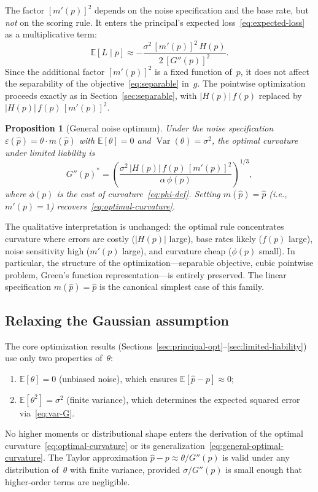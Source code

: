 \documentclass[11pt]{article}
\newtheorem{proposition}{Proposition}
\begin{document}
The factor $[m'(p)]^2$ depends on the noise specification and the base rate, but \emph{not} on the scoring rule. It enters the principal's expected loss~\eqref{eq:expected-loss} as a multiplicative term:
\[
\mathbb{E}[L \mid p] \approx -\frac{\sigma^2\,[m'(p)]^2\,H(p)}{2\,[G''(p)]^2}.
\]
Since the additional factor $[m'(p)]^2$ is a fixed function of~$p$, it does not affect the separability of the objective~\eqref{eq:separable} in~$g$. The pointwise optimization proceeds exactly as in Section~\ref{sec:separable}, with $|H(p)|\,f(p)$ replaced by $|H(p)|\,f(p)\,[m'(p)]^2$.

\begin{proposition}[General noise optimum]\label{prop:general-noise}
Under the noise specification $\varepsilon(\hat{p}) = \theta \cdot m(\hat{p})$ with $\mathbb{E}[\theta] = 0$ and $\operatorname{Var}(\theta) = \sigma^2$, the optimal curvature under limited liability is
\begin{equation}\label{eq:general-optimal-curvature}
G''(p)^* = \left(\frac{\sigma^2\,|H(p)|\,f(p)\,[m'(p)]^2}{\alpha\,\phi(p)}\right)^{\!1/3},
\end{equation}
where $\phi(p)$ is the cost of curvature~\eqref{eq:phi-def}. Setting $m(\hat{p}) = \hat{p}$ (i.e., $m'(p) = 1$) recovers~\eqref{eq:optimal-curvature}.
\end{proposition}

The qualitative interpretation is unchanged: the optimal rule concentrates curvature where errors are costly ($|H(p)|$ large), base rates likely ($f(p)$ large), noise sensitivity high ($m'(p)$ large), and curvature cheap ($\phi(p)$ small). In particular, the structure of the optimization---separable objective, cubic pointwise problem, Green's function representation---is entirely preserved. The linear specification $m(\hat{p}) = \hat{p}$ is the canonical simplest case of this family.

\subsection{Relaxing the Gaussian assumption}\label{sec:relax-gaussian}

The core optimization results (Sections~\ref{sec:principal-opt}--\ref{sec:limited-liability}) use only two properties of~$\theta$:
\begin{enumerate}
\item $\mathbb{E}[\theta] = 0$ (unbiased noise), which ensures $\mathbb{E}[\hat{p} - p] \approx 0$;
\item $\mathbb{E}[\theta^2] = \sigma^2$ (finite variance), which determines the expected squared error via~\eqref{eq:var-G}.
\end{enumerate}
No higher moments or distributional shape enters the derivation of the optimal curvature~\eqref{eq:optimal-curvature} or its generalization~\eqref{eq:general-optimal-curvature}. The Taylor approximation $\hat{p} - p \approx \theta/G''(p)$ is valid under any distribution of~$\theta$ with finite variance, provided $\sigma/G''(p)$ is small enough that higher-order terms are negligible.
\end{document}
